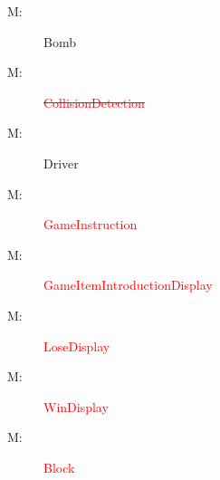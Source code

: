 \documentclass[12pt]{article}
\newcounter{mnum}
\newcommand{\mthemnum}{M\themnum}
\begin{document}
\begin{description}
\item [ \mthemnum \label{m24}:] Bomb 
\item [ \mthemnum \label{m25}:] \textcolor{red}{\st{CollisionDetection}}
\item [ \mthemnum \label{m26}:] Driver
\item [ \mthemnum \label{m27}:] \textcolor{red}{GameInstruction}
\item [ \mthemnum \label{m28}:] \textcolor{red}{GameItemIntroductionDisplay}
\item [ \mthemnum \label{m29}:] \textcolor{red}{LoseDisplay}
\item [ \mthemnum \label{m30}:] \textcolor{red}{WinDisplay}
\item [ \mthemnum \label{m31}:] \textcolor{red}{Block}
\end{description}
\end{document}
